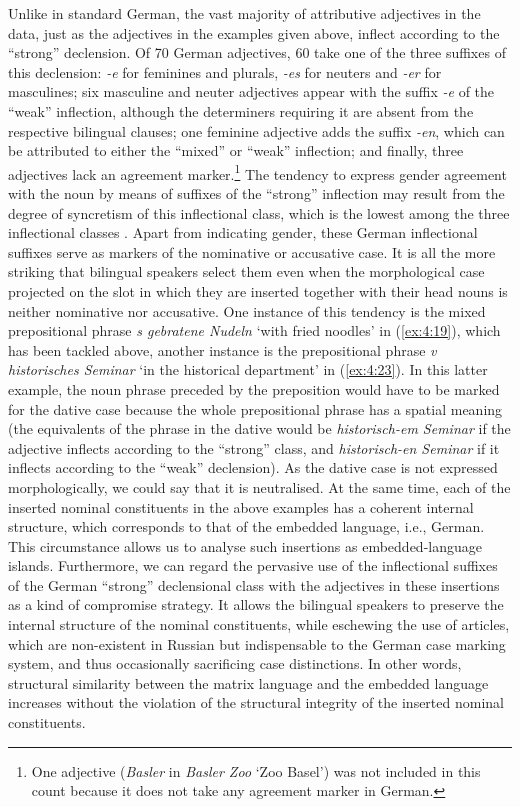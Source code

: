 Unlike in standard German, the vast majority of attributive adjectives in the data, just as the adjectives in the examples given above, inflect according to the ``strong'' declension. Of 70 German adjectives, 60 take one of the three suffixes of this declension: \textit{-e} for feminines and plurals, \textit{-es} for neuters and \textit{-er} for masculines; six masculine and neuter adjectives appear with the suffix \textit{-e} of the ``weak'' inflection, although the determiners requiring it are absent from the respective bilingual clauses;  one feminine adjective adds the suffix \textit {-en}, which can be attributed to either the ``mixed'' or ``weak'' inflection; and finally, three adjectives lack an agreement marker.\footnote{One adjective (\textit{Basler} in \textit{Basler Zoo} `Zoo Basel') was not included in this count because it does not take any agreement marker in German.} The tendency to express gender agreement with the noun by means of suffixes of the “strong” inflection may result from the degree of syncretism of this inflectional class, which is the lowest among the three inflectional classes \citep[][]{wurzel-84}. Apart from indicating gender, these German inflectional suffixes serve as markers of the nominative or accusative case. It is all the more striking that bilingual speakers select them even when the morphological case projected on the slot in which they are inserted together with their head nouns is neither nominative nor accusative. One instance of this tendency is the mixed prepositional phrase \textit{s gebratene Nudeln} `with fried noodles' in (\ref{ex:4:19}), which has been tackled above, another instance is the prepositional phrase \textit{v historisches Seminar} `in the historical department' in (\ref{ex:4:23}). In this latter example, the noun phrase preceded by the preposition would have to be marked for the dative case because the whole prepositional phrase has a spatial meaning (the equivalents of the phrase in the dative would be \textit{historisch-em Seminar} if the adjective inflects according to the “strong” class, and  \textit{historisch-en Seminar} if it inflects according to the “weak” declension). As the dative case is not expressed morphologically, we could say that it is neutralised. At the same time, each of the inserted nominal constituents in the above examples has a coherent internal structure, which corresponds to that of the embedded language, i.e., German. This circumstance allows us to analyse such insertions as embedded-language islands. Furthermore, we can regard the pervasive use of the inflectional suffixes of the German “strong” declensional class with the adjectives in these insertions as a kind of compromise strategy. It allows the bilingual speakers to preserve the internal structure of the nominal constituents, while eschewing the use of articles, which are non-existent in Russian but indispensable to the German case marking system, and thus occasionally sacrificing case distinctions. In other words, structural similarity between the matrix language and the embedded language increases without the violation of the structural integrity of the inserted nominal constituents.

